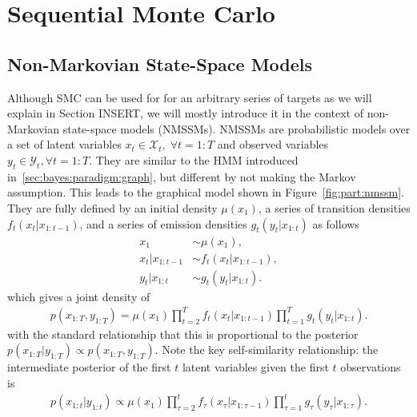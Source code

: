 
\section{Sequential Monte Carlo}
\label{sec:part:smc}

\subsection{Non-Markovian State-Space Models}
\label{sec:part:smc:nmssm}

Although SMC can be used for for an arbitrary series of targets as we will explain
in Section INSERT, we will mostly introduce it in the context of non-Markovian state-space
models (NMSSMs).  NMSSMs are probabilistic models over a set of latent variables 
$x_t \in \mathcal{X}_t, \; \forall t = 1:T$
and observed variables $y_t \in \mathcal{Y}_t, \forall t = 1:T$.  
They are similar to
the HMM introduced in~\ref{sec:bayes:paradigm:graph}, but different by not
making the Markov assumption.  This leads to the graphical model shown in Figure~\ref{fig:part:nmssm}.
They are fully defined by an initial density $\mu (x_1)$,
a series of transition densities $f_{t} (x_t | x_{1:t-1})$, and a series of
emission densities $g_{t} (y_t | x_{1:t})$ as follows
\begin{subequations}
\label{eq:part:ssm}
\begin{align}
x_1 &\sim \mu(x_1), \\
x_t | x_{1:t - 1} &\sim f_{t}(x_t | x_{1:t - 1}), \\
y_t | x_{1:t} &\sim g_{t}(y_t | x_{1:t}).
\end{align}
\end{subequations}
which gives a joint density of
\begin{align}
\label{eq:part:jointdistribution}
p(x_{1:T}, y_{1:T}) = \mu(x_1) \prod_{t = 2}^T f_{t}(x_t | x_{1:t - 1}) \prod_{t = 1}^T g_{t}(y_t | x_{1:t}).
\end{align}
with the standard relationship that this is proportional to the posterior
$p(x_{1:T} | y_{1:T}) \propto p(x_{1:T}, y_{1:T})$.  Note the
key self-similarity relationship: the intermediate posterior of the first $t$ latent variables
given the first $t$ observations is
\begin{align*}
p(x_{1:t} | y_{1:t}) \propto \mu(x_1) \prod_{\tau = 2}^t f_{\tau}(x_{\tau} | x_{1:\tau - 1}) \prod_{\tau = 1}^t g_{\tau}(y_{\tau} | x_{1:\tau}).
\end{align*}

